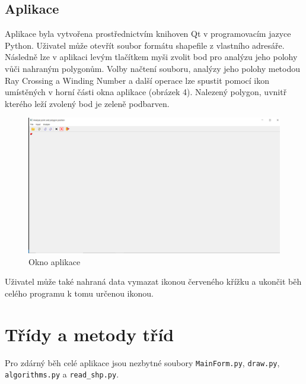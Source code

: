 \documentclass[a4paper,12pt]{article}
\begin{document}
\subsection{Aplikace}
Aplikace byla vytvořena prostřednictvím knihoven Qt v programovacím jazyce Python. 
Uživatel může otevřít soubor formátu shapefile z vlastního adresáře. Následně lze v aplikaci levým tlačítkem myši zvolit bod pro analýzu jeho polohy vůči nahraným polygonům. Volby načtení souboru, analýzy jeho polohy metodou Ray Crossing a Winding Number a další operace lze spustit pomocí ikon umístěných v horní části okna aplikace (obrázek 4). Nalezený polygon, uvnitř kterého leží zvolený bod je zeleně podbarven. 

\begin{figure}[H]
    \centering
    \includegraphics[width=1\linewidth]{okno.PNG}
    \caption{Okno aplikace}
    \label{fig:enter-label}
\end{figure}

Uživatel může také nahraná data vymazat ikonou červeného křížku a ukončit běh celého programu k tomu určenou ikonou.

\section{Třídy a metody tříd}
Pro zdárný běh celé aplikace jsou nezbytné soubory \texttt{MainForm.py}, \texttt{draw.py}, \texttt{algorithms.py} a \texttt{read\_shp.py}.
\end{document}
